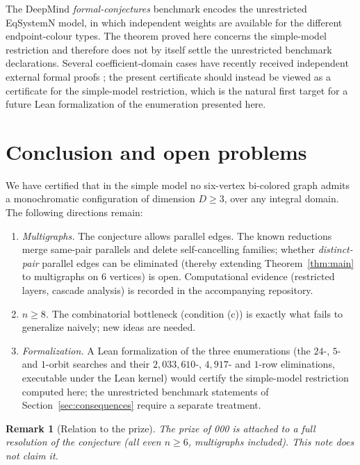 \documentclass[11pt]{article}
\newtheorem{remark}[theorem]{Remark}
\theoremstyle{definition}
\begin{document}
The DeepMind \emph{formal-conjectures} benchmark encodes the
unrestricted EqSystemN model, in which independent weights are
available for the different endpoint-colour types. The theorem proved
here concerns the simple-model restriction and therefore does not by
itself settle the unrestricted benchmark declarations. Several
coefficient-domain cases have recently received independent external
formal proofs \cite{kg63cert, kgallevenint, kgsharpbound}; the present
certificate should instead be viewed as a certificate for the
simple-model restriction, which is the natural first target for a
future Lean formalization of the enumeration presented here.

\section{Conclusion and open problems}\label{sec:open}

We have certified that in the simple model no six-vertex bi-colored
graph admits a monochromatic configuration of dimension $D\ge 3$, over
any integral domain. The following directions remain:

\begin{enumerate}[label=(\roman*)]
\item \emph{Multigraphs.} The conjecture allows parallel edges. The
known reductions merge same-pair parallels and delete self-cancelling
families; whether \emph{distinct-pair} parallel edges can be
eliminated (thereby extending Theorem~\ref{thm:main} to multigraphs on
$6$ vertices) is open. Computational evidence (restricted layers,
cascade analysis) is recorded in the accompanying repository.
\item \emph{$n\ge 8$.} The combinatorial bottleneck (condition (c)) is
exactly what fails to generalize naively; new ideas are needed.
\item \emph{Formalization.} A Lean formalization of the three
enumerations (the $24$-, $5$- and $1$-orbit searches and their
$2{,}033{,}610$-, $4{,}917$- and $1$-row eliminations, executable under
the Lean kernel) would certify the simple-model restriction computed
here; the unrestricted benchmark statements of
Section~\ref{sec:consequences} require a separate treatment.
\end{enumerate}

\begin{remark}[Relation to the prize]
The prize of 000 \cite{bounty} is attached to a full
resolution of the conjecture (all even $n\ge 6$, multigraphs
included). This note does not claim it.
\end{remark}
\end{document}
